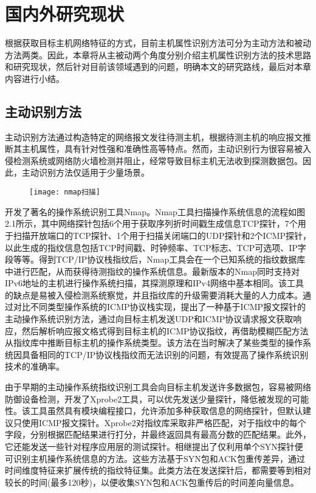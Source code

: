 \chapter{国内外研究现状}

根据获取目标主机网络特征的方式，目前主机属性识别方法可分为主动方法和被动方法两类。因此，本章将从主被动两个角度分别介绍主机属性识别方法的技术思路和研究现状，然后针对目前该领域遇到的问题，明确本文的研究路线，最后对本章内容进行小结。

\section{主动识别方法}

主动识别方法通过构造特定的网络报文发往待测主机，根据待测主机的响应报文推断其主机属性，具有针对性强和准确性高等特点。然而，主动识别行为很容易被入侵检测系统或网络防火墙检测并阻止，经常导致目标主机无法收到探测数据包。因此，主动识别方法仅适用于少量场景。

\begin{figure}[!h]
    \centering
    \texttt{[image: nmap扫描]}
\end{figure}

\citet{lyon1998remote}开发了著名的操作系统识别工具Nmap。Nmap工具扫描操作系统信息的流程如图2.1所示，其中网络探针包括6个用于获取序列折时间戳生成信息TCP探针，7个用于扫描开放端口的TCP探针、1个用于扫描关闭端口的UDP探针和2个ICMP探针，以此生成的指纹信息包括TCP时间戳、时钟频率、TCP标志、TCP可选项、IP字段等等。得到TCP/IP协议栈指纹后，Nmap工具会在一个已知系统的指纹数据库中进行匹配，从而获得待测指纹的操作系统信息。最新版本的Nmap同时支持对IPv6地址的主机进行操作系统扫描，其探测原理和IPv4网络中基本相同。该工具的缺点是易被入侵检测系统察觉，并且指纹库的升级需要消耗大量的人力成本。\citet{arkin2002remote}通过对比不同类型操作系统的ICMP协议栈实现，提出了一种基于ICMP报文探针的主动操作系统识别方法，通过向目标主机发送UDP和ICMP协议请求报文获取响应，然后解析响应报文格式得到目标主机的ICMP协议指纹，再借助模糊匹配方法从指纹库中推断目标主机的操作系统类型。该方法在当时解决了某些类型的操作系统因具备相同的TCP/IP协议栈指纹而无法识别的问题，有效提高了操作系统识别技术的准确率。

由于早期的主动操作系统指纹识别工具会向目标主机发送许多数据包，容易被网络防御设备检测，\citet{yarochkin2009xprobe2++}开发了Xprobe2工具，可以优先发送少量探针，降低被发现的可能性。该工具虽然具有模块编程接口，允许添加多种获取信息的网络探针，但默认建议只使用ICMP报文探针。Xprobe2对指纹库采取非严格匹配，对于指纹中的每个字段，分别根据匹配结果进行打分，并最终返回具有最高分数的匹配结果。此外，它还能发送一些针对程序应用层的测试探针。\citet{veysset2002new, beardsley2003snacktime, shamsi2014hershel}相继提出了仅利用单个SYN探针便可识别主机操作系统信息的方法。这些方法基于SYN包和ACK包重传差异，通过时间维度特征来扩展传统的指纹特征集。此类方法在发送探针后，都需要等到相对较长的时间(最多120秒)，以便收集SYN包和ACK包重传后的时间差向量信息。

